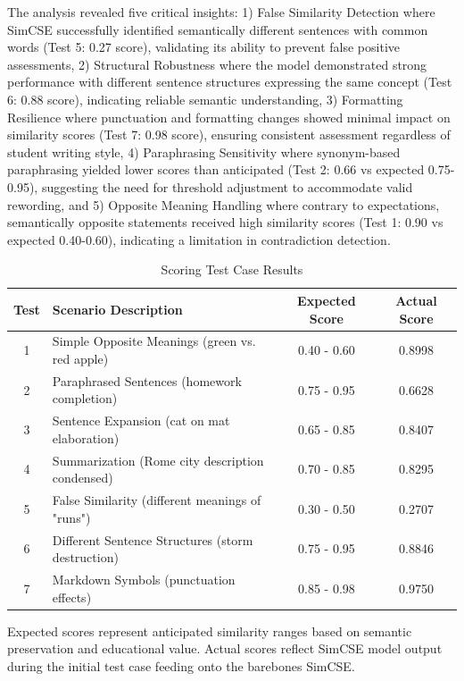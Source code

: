 {{\color{maroon}The analysis revealed five critical insights: 1) False Similarity Detection where SimCSE successfully identified semantically different sentences with common words (Test 5: 0.27 score), validating its ability to prevent false positive assessments, 2) Structural Robustness where the model demonstrated strong performance with different sentence structures expressing the same concept (Test 6: 0.88 score), indicating reliable semantic understanding, 3) Formatting Resilience where punctuation and formatting changes showed minimal impact on similarity scores (Test 7: 0.98 score), ensuring consistent assessment regardless of student writing style, 4) Paraphrasing Sensitivity where synonym-based paraphrasing yielded lower scores than anticipated (Test 2: 0.66 vs expected 0.75-0.95), suggesting the need for threshold adjustment to accommodate valid rewording, and 5) Opposite Meaning Handling where contrary to expectations, semantically opposite statements received high similarity scores (Test 1: 0.90 vs expected 0.40-0.60), indicating a limitation in contradiction detection.}

\begin{table}[!htbp]
\centering
\caption[Scoring Test Case Results]{Scoring Test Case Results}
\label{tab:test_case_results}
\begin{tabular}{|c|p{6cm}|c|c|}
\hline
\textbf{Test} & \textbf{Scenario Description} & \textbf{Expected Score} & \textbf{Actual Score} \\
\hline
1 & Simple Opposite Meanings (green vs. red apple) & 0.40 - 0.60 & 0.8998 \\
\hline
2 & Paraphrased Sentences (homework completion) & 0.75 - 0.95 & 0.6628 \\
\hline
3 & Sentence Expansion (cat on mat elaboration) & 0.65 - 0.85 & 0.8407 \\
\hline
4 & Summarization (Rome city description condensed) & 0.70 - 0.85 & 0.8295 \\
\hline
5 & False Similarity (different meanings of "runs") & 0.30 - 0.50 & 0.2707 \\
\hline
6 & Different Sentence Structures (storm destruction) & 0.75 - 0.95 & 0.8846 \\
\hline
7 & Markdown Symbols (punctuation effects) & 0.85 - 0.98 & 0.9750 \\
\hline
\end{tabular}
\end{table}
\FloatBarrier

Expected scores represent anticipated similarity ranges based on semantic preservation and educational value. Actual scores reflect SimCSE model output during the initial test case feeding onto the barebones SimCSE.



}
